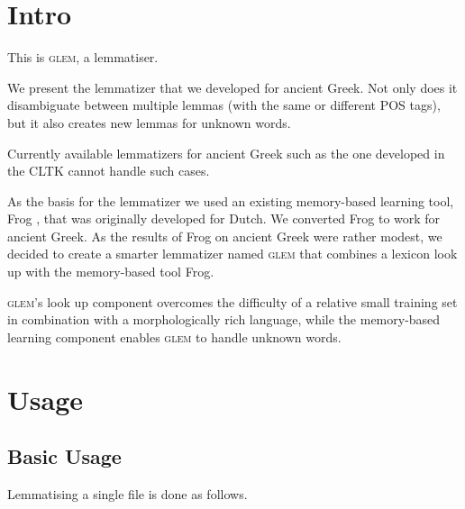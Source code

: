\documentclass[a4paper]{article}
\def\glem{\textsc{glem}}
\begin{document}

\section*{Intro}

This is \glem{}, a lemmatiser.


We present the lemmatizer that we developed for ancient Greek. Not only does it
disambiguate between multiple lemmas (with the same or different POS tags), but
it also creates new lemmas for unknown words.

Currently available lemmatizers for ancient Greek such as the one developed in
the CLTK \cite{johnson2014} cannot handle such cases.

As the basis for the lemmatizer we used an existing memory-based learning tool,
Frog \cite{Frog2016}, that was originally developed for Dutch. We converted Frog
to work for ancient Greek. As the results of Frog on ancient Greek were rather
modest, we decided to create a smarter lemmatizer named \glem{} that combines a
lexicon look up with the memory-based tool Frog.


\glem{}'s look up component overcomes the difficulty of a relative small training
set in combination with a morphologically rich
language, %
while the memory-based learning component enables \glem{} to handle unknown
words. %


\section*{Usage}

\subsection*{Basic Usage}

Lemmatising a single file is done as follows.
\end{document}
